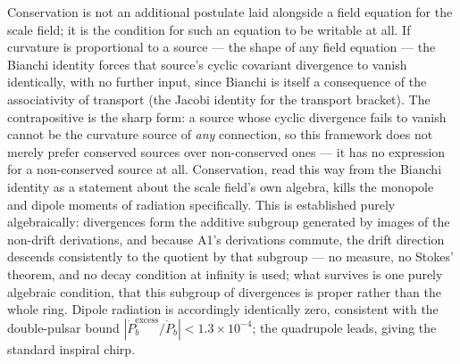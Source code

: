 \documentclass[aps,prd,twocolumn,superscriptaddress,nofootinbib]{revtex4-2}
\begin{document}
Conservation is not an additional postulate laid alongside a field
equation for the scale field; it is the condition for such an equation
to be writable at all. If curvature is proportional to a source — the
shape of any field equation — the Bianchi identity forces that source's
cyclic covariant divergence to vanish identically, with no further
input, since Bianchi is itself a consequence of the associativity of
transport (the Jacobi identity for the transport bracket). The
contrapositive is the sharp form: a source whose cyclic divergence fails
to vanish cannot be the curvature source of \emph{any} connection, so
this framework does not merely prefer conserved sources over
non-conserved ones — it has no expression for a non-conserved source at
all. Conservation, read this way from the Bianchi identity as a
statement about the scale field's own algebra, kills the monopole and
dipole moments of radiation specifically. This is established purely algebraically: divergences form the
additive subgroup generated by images of the non-drift derivations, and
because A1's derivations commute, the drift direction descends
consistently to the quotient by that subgroup — no measure, no Stokes'
theorem, and no decay condition at infinity is used; what survives is one
purely algebraic condition, that this subgroup of divergences is proper
rather than the whole ring. Dipole radiation is accordingly identically
zero, consistent with the double-pulsar bound
$|\dot P_b^{\text{excess}}/\dot P_b|<1.3\times10^{-4}$; the quadrupole
leads, giving the standard inspiral chirp.
\end{document}
